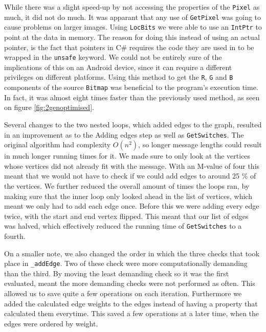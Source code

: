 While there was a slight speed-up by not accessing the properties of the \lstinline|Pixel| as much, it did not do much.
It was apparant that any use of \lstinline|GetPixel| was going to cause problems on larger images.
Using \lstinline|LocBits| we were able to use an \lstinline|IntPtr| to point at the data in memory.\citep{MSDNIntPtr}
The reason for doing this instead of using an actual pointer, is the fact that pointers in C\# requires the code they are used in to be wrapped in the \lstinline|unsafe| keyword. 
We could not be entirely sure of the implications of this on an Android device, since it can require a different privileges on different platforms.
Using this method to get the \lstinline|R|, \lstinline|G| and \lstinline|B| components of the source \lstinline|Bitmap| was beneficial to the program's execution time.
In fact, it was almost eight times faster than the previously used method, as seen on figure \ref{fig:2genoptimised}.

Several changes to the two nested loops, which added edges to the graph, resulted in an improvement as to the Adding edges step as well as \lstinline|GetSwitches|.
The original algorithm had complexity $O(n^2)$, so longer message lengths could result in much longer running times for it.
We made sure to only look at the vertices whose vertices did not already fit with the message.
With an M-value of four this meant that we would not have to check if we could add edges to around 25 \% of the vertices.
We further reduced the overall amount of times the loops ran, by making sure that the inner loop only looked ahead in the list of vertices, which meant we only had to add each edge once.
Before this we were adding every edge twice, with the start and end vertex flipped.
This meant that our list of edges was halved, which effectively reduced the running time of \lstinline|GetSwitches| to a fourth.

On a smaller note, we also changed the order in which the three checks that took place in \lstinline|_addEdge|.
Two of these check were more computationally demanding than the third.
By moving the least demanding check so it was the first evaluated, meant the more demanding checks were not performed as often.
This allowed us to save quite a few operations on each iteration. 
Furthermore we added the calculated edge weights to the edges instead of having a property that calculated them everytime. 
This saved a few operations at a later time, when the edges were ordered by weight.

